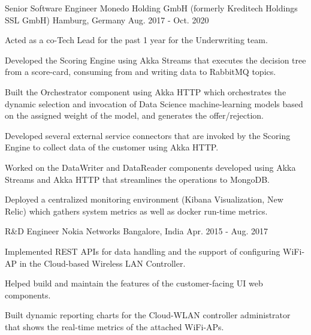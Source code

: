 \begin{cventries}
  \cventry
    {Senior Software Engineer} %
    {Monedo Holding GmbH (formerly Kreditech Holdings SSL GmbH)} %
    {Hamburg, Germany} %
    {Aug. 2017 - Oct. 2020} %
    {
      \begin{cvitems} %
        \item {Acted as a co-Tech Lead for the past 1 year for the Underwriting team.}
        \item {Developed the Scoring Engine using Akka Streams that executes the decision tree from a score-card, consuming from and writing data to RabbitMQ topics.}
        \item {Built the Orchestrator component using Akka HTTP which orchestrates the dynamic selection and invocation of Data Science machine-learning models based on the assigned weight of the model, and generates the offer/rejection.}
        \item {Developed several external service connectors that are invoked by the Scoring Engine to collect data of the customer using Akka HTTP.}
        \item {Worked on the DataWriter and DataReader components developed using Akka Streams and Akka HTTP that streamlines the operations to MongoDB.}
        \item {Deployed a centralized monitoring environment (Kibana Visualization, New Relic) which gathers system metrics as well as docker run-time metrics.}
      \end{cvitems}
    }

  \cventry
    {R\&D Engineer} %
    {Nokia Networks} %
    {Bangalore, India} %
    {Apr. 2015 - Aug. 2017} %
    {
      \begin{cvitems} %
        \item {Implemented REST APIs for data handling and the support of configuring WiFi-AP in the Cloud-based Wireless LAN Controller.}
        \item {Helped build and maintain the features of the customer-facing UI web components.}
        \item {Built dynamic reporting charts for the Cloud-WLAN controller administrator that shows the real-time metrics of the attached WiFi-APs.}
      \end{cvitems}
    }


\end{cventries}
